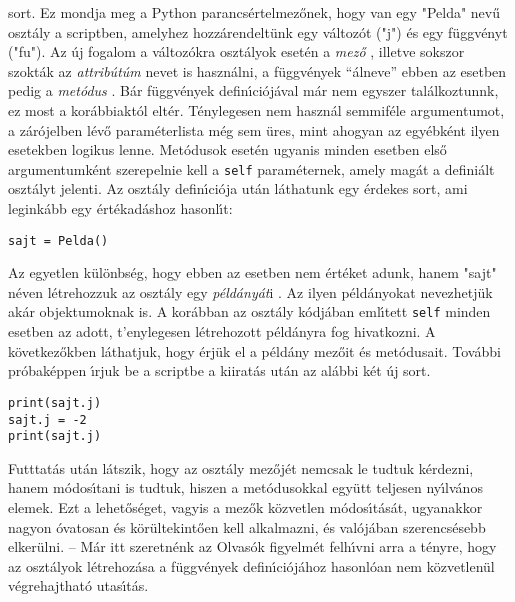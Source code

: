 sort. Ez mondja meg a Python parancs\'ertelmez\H{o}nek, hogy van egy "Pelda" nev\H{u} oszt\'aly a scriptben, amelyhez 
hozz\'arendelt\"unk egy v\'altoz\'ot ("j") \'es egy f\"uggv\'enyt ("fu"). Az \'uj fogalom a v\'altoz\'okra oszt\'alyok 
eset\'en a {\sl mez\H{o}} , illetve sokszor szokt\'ak az {\sl attrib\'ut\'um}  nevet 
is haszn\'alni, a f\"uggv\'enyek ``\'alneve'' ebben az esetben pedig a {\sl met\'odus} . B\'ar 
f\"uggv\'enyek defin\'{\i}ci\'oj\'aval m\'ar nem egyszer tal\'alkoztunnk, ez most a kor\'abbiakt\'ol elt\'er. 
T\'enylegesen nem haszn\'al semmif\'ele argumentumot, a z\'ar\'ojelben l\'ev\H{o} param\'eterlista m\'eg sem \"ures, 
mint ahogyan az egy\'ebk\'ent ilyen esetekben logikus lenne. Met\'odusok eset\'en ugyanis minden esetben els\H{o} 
argumentumk\'ent szerepelnie kell a {\tt self} param\'eternek, amely mag\'at a defini\'alt oszt\'alyt jelenti. Az 
oszt\'aly defin\'{\i}ci\'oja ut\'an l\'athatunk egy \'erdekes sort, ami legink\'abb egy \'ert\'ekad\'ashoz 
hasonl\'{\i}t:

\begin{Verbatim}[fontsize=\small]
sajt = Pelda()
\end{Verbatim}

\noindent Az egyetlen k\"ul\"onbs\'eg, hogy ebben az esetben nem \'ert\'eket adunk, hanem "sajt" n\'even l\'etrehozzuk 
az oszt\'aly egy {\sl p\'eld\'any\'at}i . Az ilyen p\'eld\'anyokat nevezhetj\"uk ak\'ar 
objektumoknak is. A kor\'abban 
az oszt\'aly k\'odj\'aban eml\'{\i}tett {\tt self} minden esetben az adott, t'enylegesen l\'etrehozott p\'eld\'anyra 
fog hivatkozni. A k\"ovetkez\H{o}kben l\'athatjuk, hogy \'erj\"uk el a p\'eld\'any mez\H{o}it \'es met\'odusait. 
Tov\'abbi pr\'obak\'eppen \'{\i}rjuk be a scriptbe a kiirat\'as ut\'an az al\'abbi k\'et \'uj sort.

\begin{Verbatim}[fontsize=\small]
print(sajt.j)
sajt.j = -2
print(sajt.j)
\end{Verbatim}

\noindent Futttat\'as ut\'an l\'atszik, hogy az oszt\'aly mez\H{o}j\'et nemcsak le tudtuk k\'erdezni, hanem m\'odos\'{\i}tani 
is tudtuk, hiszen a met\'odusokkal egy\"utt teljesen ny\'{\i}lv\'anos elemek. Ezt a lehet\H{o}s\'eget, vagyis a 
mez\H{o}k k\"ozvetlen m\'odos\'{\i}t\'as\'at, ugyanakkor nagyon \'ovatosan \'es k\"or\"ultekint\H{o}en kell alkalmazni, 
\'es val\'oj\'aban szerencs\'esebb elker\"ulni. -- M\'ar itt szeretn\'enk az Olvas\'ok figyelm\'et felh\'{\i}vni arra a 
t\'enyre, hogy az oszt\'alyok l\'etrehoz\'asa a f\"uggv\'enyek defin\'{\i}ci\'oj\'ahoz hasonl\'oan nem k\"ozvetlen\"ul 
v\'egrehajthat\'o utas\'{\i}t\'as.


